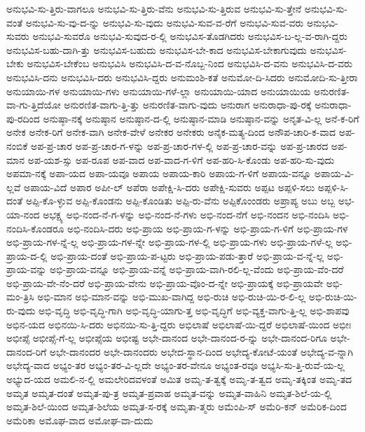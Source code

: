 {ಅನುಭವಿ-ಸು-ತ್ತಿರು-ವಾಗಲೂ
ಅನುಭವಿ-ಸು-ತ್ತಿರು-ವೆನು
ಅನುಭವಿ-ಸು-ತ್ತಿರುವ
ಅನುಭವಿ-ಸು-ತ್ತೇನೆ
ಅನುಭವಿ-ಸು-ವಂತೆ
ಅನುಭವಿ-ಸು-ವು-ದ-ನ್ನು
ಅನುಭವಿ-ಸು-ವುದು
ಅನುಭವಿ-ಸುವ-ವ-ರೆಗೆ
ಅನುಭವಿ-ಸುವ-ವರು
ಅನುಭವಿ-ಸುವರು
ಅನುಭವಿ-ಸುವರೊ
ಅನುಭವಿ-ಸುವುದ-ರ-ಲ್ಲಿ
ಅನುಭವಿಸ-ತೊಡಗಿದರು
ಅನುಭವಿಸ-ಬ-ಲ್ಲ-ವ-ರಾಗಿ-ದ್ದರು
ಅನುಭವಿಸ-ಬಹು-ದಾಗಿ-ತ್ತು
ಅನುಭವಿಸ-ಬಹುದು
ಅನುಭವಿಸ-ಬೇ-ಕಾದ
ಅನುಭವಿಸ-ಬೇಕಾಗುವುದು
ಅನುಭವಿಸ-ಬೇಕು
ಅನುಭವಿಸ-ಬೇಕೆಂಬ
ಅನುಭವಿಸಿ
ಅನುಭವಿಸಿ-ದ-ವ-ನೊಬ್ಬ-ನಿಂದ
ಅನುಭವಿಸಿ-ದ-ವನು
ಅನುಭವಿಸಿ-ದ-ವರು
ಅನುಭವಿಸಿ-ದನು
ಅನುಭವಿಸಿ-ದರು
ಅನುಭವಿಸಿ-ದ್ದರು
ಅನುಮಂಶಿ-ಕತೆ
ಅನುಮೋ-ದಿ-ಸಿದರು
ಅನುಮೋದಿ-ಸು-ತ್ತೀರಾ
ಅನುಯಾಯಿ-ಗಳ
ಅನುಯಾಯಿ-ಗಳು
ಅನುಯಾಯಿ-ಗಳೆ-ಲ್ಲಾ
ಅನುಯಾಯಿ-ಯಾದ
ಅನುಯಾಯಿಯ
ಅನುರಣಿತ-ವಾ-ಗು-ತ್ತಿದೆಯೋ
ಅನುರಣಿತ-ವಾಗು-ತ್ತಿ-ತ್ತು
ಅನುರಣಿತ-ವಾಗು-ವುದು
ಅನುರಾಗ
ಅನುರಾಧಾ-ಪು-ರಕ್ಕೆ
ಅನುರಾಧಾ-ಪು-ರದಿಂದ
ಅನುಷ್ಠಾ-ನಕ್ಕೆ
ಅನುಷ್ಠಾನ
ಅನುಷ್ಠಾನ-ದ-ಲ್ಲಿ
ಅನುಷ್ಠಾನ-ಮಾಡಿ
ಅನುಷ್ಠಾನ-ವನ್ನು
ಅನೃತ-ವಿ-ಲ್ಲ
ಅನೆ-ಕ-ರಿಗೆ
ಅನೇಕ
ಅನೇಕ-ರಿಗೆ
ಅನೇಕ-ವಾಗಿ
ಅನೇಕ-ವೇಳೆ
ಅನೇಕರ
ಅನೇಕರು
ಅನೈಕ-ಮತ್ಯ-ದಿಂದ
ಅನೌಪ-ಚಾರಿ-ಕ-ವಾದ
ಅಪ-ನಂಬಿಕೆ
ಅಪ-ಪ್ರ-ಚಾರ
ಅಪ-ಪ್ರ-ಚಾರ-ಗ-ಳನ್ನು
ಅಪ-ಪ್ರ-ಚಾರ-ಗಳ-ಲ್ಲಿ
ಅಪ-ಪ್ರ-ಚಾರ-ವನ್ನು
ಅಪ-ಪ್ರ-ಚಾರದ
ಅಪ-ಮಾನ
ಅಪ-ಯಶ-ಸ್ಸು
ಅಪ-ರೂಪ
ಅಪ-ವಾದ
ಅಪ-ವಾದ-ಗ-ಳಿಗೆ
ಅಪ-ಹರಿ-ಸಿ-ಕೊಂಡು
ಅಪ-ಹರಿ-ಸು-ವುದು
ಅಪಮಾ-ನಕ್ಕೆ
ಅಪಾ-ಯದ
ಅಪಾ-ಯವೂ
ಅಪಾಯ
ಅಪಾಯ-ಕಾರಿ
ಅಪಾಯ-ಗ-ಳಿಗೆ
ಅಪಾಯ-ವನ್ನೂ
ಅಪಾಯ-ವಿ-ಲ್ಲವೆ
ಅಪಾಯ-ವಿದೆ
ಅಪಾರ
ಅಪೀ-ಲ್
ಅಪೆರಾ
ಅಪೇಕ್ಷಿ-ಸಿ-ದರು
ಅಪೇಕ್ಷಿ-ಸುವರು
ಅಪ್ಪಟ
ಅಪ್ಪಳಿ-ಸಲು
ಅಪ್ಪಳಿ-ಸಿ-ದಂತೆ
ಅಪ್ಪಿ-ಕೊ-ಳ್ಳುವ
ಅಪ್ಪಿ-ಕೊಂಡನು
ಅಪ್ಪಿ-ಕೊಂಡಿತು
ಅಪ್ಪಿ-ರು-ವೆನು
ಅಪ್ಪಿಕೊಂಂಡರು
ಅಪ್ರಾಪ್ಯ
ಅಬು
ಅಬ್ಬ
ಅಭ-ಯಾ-ನಂದ
ಅಭಕ್ಷ್ಯ
ಅಭಿ-ನಂದ-ನೆ-ಗ-ಳನ್ನು
ಅಭಿ-ನಂದ-ನೆ-ಗಳು
ಅಭಿ-ನಂದ-ನೆಗೆ
ಅಭಿ-ನಂದನ
ಅಭಿ-ನಂದಿಸಿ
ಅಭಿ-ನಂದಿಸಿ-ಕೊಂಡರೂ
ಅಭಿ-ನಂದಿಸಿ-ದರು
ಅಭಿ-ಪ್ರಾಯ
ಅಭಿ-ಪ್ರಾಯ-ಗ-ಳನ್ನು
ಅಭಿ-ಪ್ರಾಯ-ಗ-ಳಿಗೆ
ಅಭಿ-ಪ್ರಾಯ-ಗಳ
ಅಭಿ-ಪ್ರಾಯ-ಗಳ-ನ್ನೆ-ಲ್ಲ
ಅಭಿ-ಪ್ರಾಯ-ಗಳ-ನ್ನೇ
ಅಭಿ-ಪ್ರಾಯ-ಗಳ-ಲ್ಲಿ
ಅಭಿ-ಪ್ರಾಯ-ಗಳು
ಅಭಿ-ಪ್ರಾಯ-ಗಳೆ-ಲ್ಲ
ಅಭಿ-ಪ್ರಾಯ-ದ-ಲ್ಲಿ
ಅಭಿ-ಪ್ರಾಯ-ದಂತೆ
ಅಭಿ-ಪ್ರಾಯ-ಪ-ಟ್ಟರು
ಅಭಿ-ಪ್ರಾಯ-ಪಡು-ತ್ತಾರೆ
ಅಭಿ-ಪ್ರಾಯ-ವ-ನ್ನೆ-ಲ್ಲ
ಅಭಿ-ಪ್ರಾಯ-ವನ್ನು
ಅಭಿ-ಪ್ರಾಯ-ವನ್ನೂ
ಅಭಿ-ಪ್ರಾಯ-ವನ್ನೆ
ಅಭಿ-ಪ್ರಾಯ-ವಾಗಿ-ರಲಿ-ಲ್ಲ-ವೆಂದು
ಅಭಿ-ಪ್ರಾಯ-ವೆಂ-ದರೆ
ಅಭಿ-ಪ್ರಾಯ-ವೇ-ನೆಂ-ದರೆ
ಅಭಿ-ಪ್ರಾಯ-ವೇನು
ಅಭಿ-ಪ್ರಾಯ-ವೊಂ-ದ-ನ್ನೇ
ಅಭಿ-ಪ್ರಾಯಕ್ಕೆ
ಅಭಿ-ಪ್ರಾಯವೇ
ಅಭಿ-ಮಂ-ತ್ರಿಸಿ
ಅಭಿ-ಮಾನ
ಅಭಿ-ಮಾನ-ವನ್ನು
ಅಭಿ-ಮುಖ-ವಾಗಿದ್ದ
ಅಭಿ-ರುಚಿ
ಅಭಿ-ರುಚಿ-ಯಿ-ರ-ಲಿ-ಲ್ಲ
ಅಭಿ-ರುಚಿ-ಯಿ-ರು-ವುದು
ಅಭಿ-ವೃದ್ಧಿ
ಅಭಿ-ವೃದ್ಧಿ-ಗಾಗಿ
ಅಭಿ-ವೃದ್ಧಿ-ಯಾಗು-ತ್ತ
ಅಭಿ-ವೃದ್ಧಿಗೆ
ಅಭಿ-ವ್ಯಕ್ತ-ವಾಗು-ತ್ತಿ-ಲ್ಲ
ಅಭಿ-ಶಾಪವು
ಅಭಿನ-ಯದ
ಅಭಿನಯಿ-ಸಿ-ದರು
ಅಭಿನಯಿ-ಸು-ತ್ತಿ-ದ್ದರು
ಅಭಿಲಾಷೆ
ಅಭಿಲಾಷೆ-ಯಿ-ದ್ದರೆ
ಅಭಿಲಾಷೆ-ಯಿಂದ
ಅಭೀಃ
ಅಭೀಪ್ಸೆ
ಅಭೀಪ್ಸೆ-ಗೆ-ಲ್ಲ
ಅಭೀಪ್ಸೆಯ
ಅಭೀಷ್ಟ
ಅಭೇ-ದಾನಂದ
ಅಭೇ-ದಾನಂದ-ರ-ನ್ನು
ಅಭೇ-ದಾನಂದ-ರಿಗೂ
ಅಭೇ-ದಾನಂದ-ರಿಗೆ
ಅಭೇ-ದಾನಂದರ
ಅಭೇ-ದಾನಂದರು
ಅಭೇದ-ಸ್ಥಾನ-ದಿಂದ
ಅಭೇದ್ಯ-ಕೋಟೆ-ಯಂತೆ
ಅಭೇದ್ಯ-ವ-ನ್ನಾಗಿ
ಅಭೇದ್ಯ-ವಾದ
ಅಭ್ಯಂ-ತರ
ಅಭ್ಯಂ-ತರ-ವಿ-ಲ್ಲದೇ
ಅಭ್ಯಂ-ತರ-ವೇನೂ
ಅಭ್ಯಂತ-ರವೂ
ಅಭ್ಯಸಿ-ಸು-ತ್ತಿ-ರುವೆ-ಯ-ಲ್ಲ
ಅಭ್ಯುದ-ಯದ
ಅಮಲಿ-ನ-ಲ್ಲಿ
ಅಮಲೇರಿದವಳಂತೆ
ಅಮಿತ
ಅಮೃ-ತ-ತ್ವಕ್ಕೆ
ಅಮೃ-ತ-ತ್ವದ
ಅಮೃ-ತಕ್ಕಿಂತ
ಅಮೃ-ತದ
ಅಮೃತ
ಅಮೃತ-ದಂತೆ
ಅಮೃತ-ಪು-ತ್ರ
ಅಮೃತ-ಪ್ರವಾಹ
ಅಮೃತ-ವನ್ನು
ಅಮೃತ-ವಾಹಿನಿ
ಅಮೃತ-ಶಿಲೆ-ಯ-ಲ್ಲಿ
ಅಮೃತ-ಶಿಲೆ-ಯಿಂದ
ಅಮೃತ-ಶಿಲೆಯ
ಅಮೃತ-ಸ-ರಕ್ಕೆ
ಅಮೃತಾ-ತ್ಮರು
ಅಮೆಂಪಿ-ಸ್
ಅಮೆರಿ-ಕನ್
ಅಮೆರಿಕ-ದಿಂದ
ಅಮೆರಿಕಾ
ಅಮೊಘ-ವಾದ
ಅಮೋಘ-ವಾ-ದುದು
}

